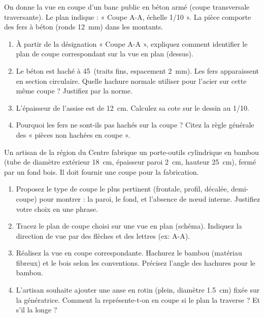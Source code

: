 \documentclass[11pt]{article}
\begin{document}
\begin{exercice}
On donne la vue en coupe d'un banc public en béton armé (coupe transversale traversante). Le plan indique : « Coupe A-A, échelle 1/10 ». La pièce comporte des fers à béton (ronds \SI{12}{\milli\metre}) dans les montants.
\begin{enumerate}
    \item À partir de la désignation « Coupe A-A », expliquez comment identifier le plan de coupe correspondant sur la vue en plan (dessus).
    \item Le béton est haché à 45\textdegree\ (traits fins, espacement \SI{2}{\milli\metre}). Les fers apparaissent en section circulaire. Quelle hachure normale utiliser pour l'acier sur cette même coupe ? Justifiez par la norme.
    \item L'épaisseur de l'assise est de \SI{12}{\centi\metre}. Calculez sa cote sur le dessin au 1/10.
    \item Pourquoi les fers ne sont-ils pas hachés sur la coupe ? Citez la règle générale des « pièces non hachées en coupe ».
\end{enumerate}
\end{exercice}

\begin{exercice}
Un artisan de la région du Centre fabrique un porte-outils cylindrique en bambou (tube de diamètre extérieur \SI{18}{\centi\metre}, épaisseur paroi \SI{2}{\centi\metre}, hauteur \SI{25}{\centi\metre}), fermé par un fond bois. Il doit fournir une coupe pour la fabrication.
\begin{enumerate}
    \item Proposez le type de coupe le plus pertinent (frontale, profil, décalée, demi-coupe) pour montrer : la paroi, le fond, et l'absence de nœud interne. Justifiez votre choix en une phrase.
    \item Tracez le plan de coupe choisi sur une vue en plan (schéma). Indiquez la direction de vue par des flèches et des lettres (ex: A-A).
    \item Réalisez la vue en coupe correspondante. Hachurez le bambou (matériau fibreux) et le bois selon les conventions. Précisez l'angle des hachures pour le bambou.
    \item L'artisan souhaite ajouter une anse en rotin (plein, diamètre \SI{1,5}{\centi\metre}) fixée sur la génératrice. Comment la représente-t-on en coupe si le plan la traverse ? Et s'il la longe ?
\end{enumerate}
\end{exercice}
\end{document}
